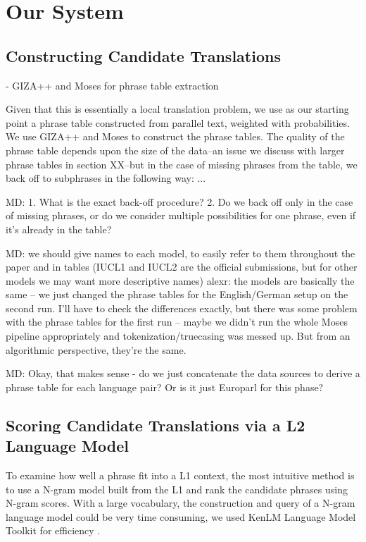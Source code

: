 \documentclass[11pt]{article}
\begin{document}
\section{Our  System}

\subsection{Constructing Candidate Translations}

- GIZA++ and Moses for phrase table extraction

Given that this is essentially a local translation problem, we use as our starting point a phrase table constructed from parallel text, weighted with probabilities.  We use GIZA++ \cite{och:ney:00} and Moses \cite{koehn:hoang:ea:07} to construct the phrase tables.  The quality of the phrase table depends upon the size of the data--an issue we discuss with larger phrase tables in section XX--but in the case of missing phrases from the table, we back off to subphrases in the following way: ...

MD: 1. What is the exact back-off procedure? 2. Do we back off only in the case of missing phrases, or do we consider multiple possibilities for one phrase, even if it’s already in the table?

MD: we should give names to each model, to easily refer to them throughout the paper and in tables (IUCL1 and IUCL2 are the official submissions, but for other models we may want more descriptive names)
alexr: the models are basically the same -- we just changed the phrase tables for the English/German setup on the second run. I'll have to check the differences exactly, but there was some problem with the phrase tables for the first run -- maybe we didn't run the whole Moses pipeline appropriately and tokenization/truecasing was messed up. But from an algorithmic perspective, they're the same.

MD: Okay, that makes sense - do we just concatenate the data sources to derive a phrase table for each language pair?  Or is it just Europarl for this phase?

\subsection{Scoring Candidate Translations via a L2 Language Model}
To examine how well a phrase fit into a L1 context, the most intuitive method is to use a N-gram model built from the L1 and rank the candidate phrases using N-gram scores. With a large vocabulary, the construction and query of a N-gram language model could be very time consuming, we used KenLM Language Model Toolkit for efficiency \cite{heafield:kenlm:11}. 
\end{document}
